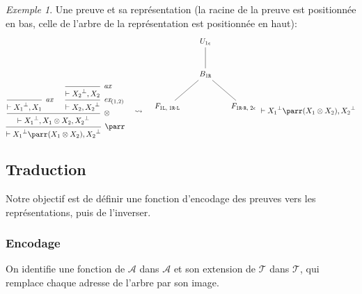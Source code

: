 \documentclass[11pt,a4paper]{article}
\theoremstyle{plain}
\theoremstyle{definition}
\theoremstyle{remark}
\newtheorem{example}{Exemple}
\newcommand*{\orth}{^\perp}
\newcommand*{\tensor}{\otimes}
\newcommand*{\axv}[1]{\infer{0}[\ensuremath{\mathit{ax}}]{\vdash #1}}
\newcommand*{\tensorv}[1]{\infer{2}[\ensuremath{\tensor}]{\vdash #1}}
\newcommand*{\parrv}[1]{\infer{1}[\ensuremath{\parr}]{\vdash #1}}
\newcommand*{\permv}[2]{\infer{1}[\ensuremath{\textit{ex}_{#1}}]{\vdash #2}}
\newcommand*{\Left}{\textnormal{\texttt{L}}}
\newcommand*{\Right}{\textnormal{\texttt{R}}}
\newcommand*{\addresses}{\ensuremath{\mathcal{A}}}
\newcommand*{\trees}{\ensuremath{\mathcal{T}}}
\begin{document}
\begin{example}
Une preuve et sa représentation (la racine de la preuve est positionnée en bas, celle de l'arbre de la représentation est positionnée en haut):
\begin{equation*}
\begin{prooftree}
    \axv{{X_1}\orth, X_1}
    \axv{{X_2}\orth, X_2}
    \permv{(1,2)}{X_2, {X_2}\orth}
    \tensorv{{X_1}\orth, X_1 \tensor X_2, {X_2}\orth}
    \parrv{{X_1}\orth \parr (X_1 \tensor X_2), {X_2}\orth}
\end{prooftree}
\quad\leadsto\quad
\begin{tikzpicture}%
    [level distance=1.5cm,
    level 2/.style={sibling distance=3.5cm}]
    \node {$U_{1 \epsilon}$}
    child {node {$B_{1 \Right}$}
        child {node {$F_{1 \Left, \; 1 \Right \cdot \Left}$}}
        child {node {$F_{1 \Right \cdot \Right, \; 2 \epsilon}$}}
    };
\end{tikzpicture}
\vdash {X_1}\orth \parr (X_1 \tensor X_2), {X_2}\orth
\end{equation*}
\end{example}

\subsection{Traduction}
Notre objectif est de définir une fonction d'encodage des preuves vers les représentations, puis de l'inverser.

\subsubsection{Encodage}

On identifie une fonction de $\addresses$ dans $\addresses$ et son extension de $\trees$ dans $\trees$, qui remplace chaque adresse de l'arbre par son image.
\end{document}
